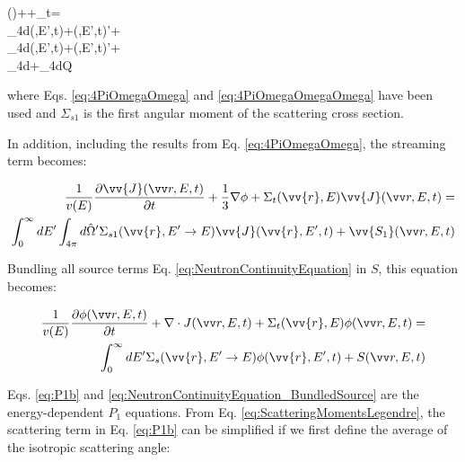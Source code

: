 \beqa
\label{eq:P1a}
\left(\right)+\nabla\phi\sset+\Sigma_t\sset{}\sset=\\
\int_{4\pi}d\hO\inscatteringsource\left\lbrack{}\phi(,E',t)+(,E',t)\hO'\right\rbrack\hO+\\
\int_{4\pi}d\hO\promptfissionsource\left\lbrack{}\phi(,E',t)+(,E',t)\hO'\right\rbrack\hO+\\
\int_{4\pi}d\hO\hO\delayedfissionsource+\int_{4\pi}d\hO Q\seat\hO
\eeqa

where Eqs. \eqref{eq:4PiOmegaOmega} and \eqref{eq:4PiOmegaOmegaOmega} have been used and \(\Sigma_{s1}\) is the first angular moment of the scattering cross section.

In addition, including the results from Eq. \ref{eq:4PiOmegaOmega}, the streaming term becomes:

\begin{equation}
\label{eq:P1b}
\begin{aligned}
\frac{1}{v(E)} \frac{\partial\vv{J}\spas}{\partial t} +
 \frac{1}{3}\nabla\phi + 
 \Sigma_t(\vv{r},E)\vv{J}\spas = \\
 \int_{0}^{\infty}dE' \int_{4\pi}^{ } d\hO  ' \Sigma_{s1}(\vv{r}, E'\rightarrow E)\vv{J}(\vv{r}, E', t) + \vv{S_1}\spas
\end{aligned}
\end{equation}

Bundling all source terms Eq. \ref{eq:NeutronContinuityEquation} in \(S\), this equation becomes:

\begin{equation}
\label{eq:NeutronContinuityEquation_BundledSource}
\begin{aligned}
\frac{1}{v(E)} \frac{\partial\phi\spas}{\partial t} +
 \nabla\cdot J\spas + 
 \Sigma_t(\vv{r},E)\phi\spas = \\
 \int_{0}^{\infty}dE' \Sigma_s(\vv{r}, E'\rightarrow E)\phi(\vv{r}, E', t) + S\spas\\
\end{aligned}
\end{equation}

Eqs. \ref{eq:P1b} and \ref{eq:NeutronContinuityEquation_BundledSource} are the energy-dependent \(P_1\) equations. From Eq. \ref{eq:ScatteringMomentsLegendre}, the scattering term in Eq. \ref{eq:P1b} can be simplified if we first define the average of the isotropic scattering angle:

